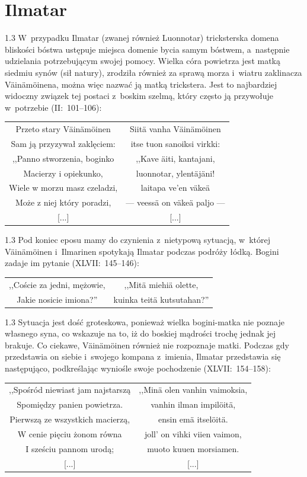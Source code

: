 \documentclass[11pt,a4paper,twoside]{report}
\begin{document}
\section{Ilmatar}
\begin{spacing}{1.3}
W~przypadku Ilmatar (zwanej również Luonnotar) tricksterska domena bliskości bóstwa ustępuje miejsca domenie bycia samym bóstwem, a~następnie udzielania potrzebującym swojej pomocy. Wielka córa powietrza jest matką siedmiu synów (sił natury), zrodziła również za sprawą morza i~wiatru zaklinacza Väinämöinena, można więc nazwać ją matką trickstera. Jest to najbardziej widoczny związek tej postaci z~boskim szelmą, który często ją przywołuje w~potrzebie (II:~101--106):
\end{spacing}
{\centering
\small
\begin{longtable}{c c}
Przeto stary Väinämöinen & Siitä vanha Väinämöinen \\
Sam ją przyzywał zaklęciem: & itse tuon sanoiksi virkki: \\
,,Panno stworzenia, boginko & ,,Kave äiti, kantajani, \\
Macierzy i opiekunko, & luonnotar, ylentäjäni! \\
Wiele w morzu masz czeladzi, & laitapa ve’en väkeä \\
Może z niej który poradzi, & --- veessä on väkeä paljo --- \\
{[...]} & {[...]}\\
\end{longtable}
}
\begin{spacing}{1.3}
Pod koniec eposu mamy do czynienia z~nietypową sytuacją, w~której Väinämöinen i~Ilmarinen spotykają Ilmatar podczas podróży łódką. Bogini zadaje im pytanie (XLVII:~145--146):
\end{spacing}
{\centering
\small
\begin{longtable}{c c}
,,Coście za jedni, mężowie, & ,,Mitä miehiä olette, \\
Jakie nosicie imiona?'' & kuinka teitä kutsutahan?'' \\
\end{longtable}
}
\begin{spacing}{1.3}
Sytuacja jest dość groteskowa, ponieważ wielka bogini-matka nie poznaje własnego syna, co wskazuje na to, iż do boskiej mądrości trochę jednak jej brakuje. Co ciekawe, Väinämöinen również nie rozpoznaje matki. Podczas gdy przedstawia on siebie i~swojego kompana z~imienia, Ilmatar przedstawia się następująco, podkreślając wyniośle swoje pochodzenie (XLVII:~154--158):
\end{spacing}
\newpage
{\centering
\small
\begin{longtable}{c c}
,,Spośród niewiast jam najstarszą & ,,Minä olen vanhin vaimoksia,\\
Spomiędzy panien powietrza. & vanhin ilman impilöitä,\\
Pierwszą ze wszystkich macierzą, & ensin emä itselöitä.\\
W cenie pięciu żonom równa & joll’ on vihki viien vaimon,\\
I sześciu pannom urodą; & muoto kuuen morsiamen.\\
{[...]} & {[...]} \\
\end{longtable}
}
\end{document}
